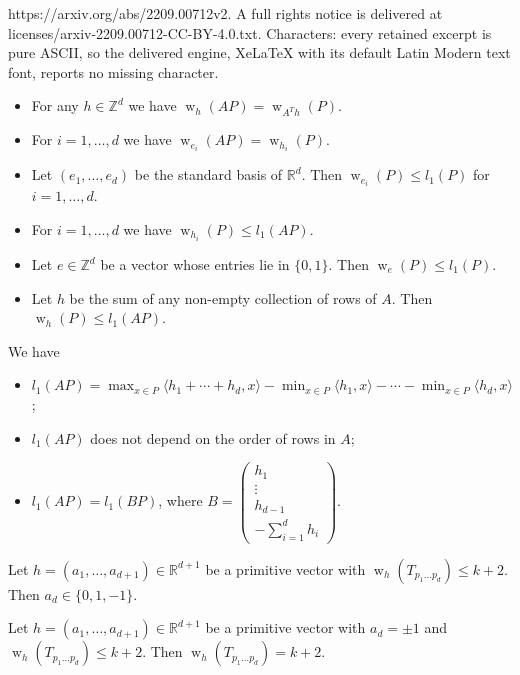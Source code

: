 \documentclass[10pt,a4paper]{amsart}
\newcommand{\R}{\mathbb R}
\newcommand{\Z}{\mathbb Z}
\newcommand{\w}{\operatorname{w}}
\begin{document}
https://arxiv.org/abs/2209.00712v2. A full rights notice is delivered at licenses/arxiv-2209.00712-CC-BY-4.0.txt. Characters: every retained excerpt is pure ASCII, so the delivered engine, XeLaTeX with its default Latin Modern text font, reports no missing character.
\begin{Lemma}\label{L:IntroLemma1}
\begin{itemize} 
\item[(1)] For any $h\in \Z^d$ we have $\w_{h}(AP)=\w_{A^{T}h}(P)$.
\item[(2)] For $i=1,\dots, d$ we have $\w_{e_i}(AP)=\w_{h_i}(P)$.
\item[(3)] Let $(e_1,\dots,e_d)$ be the standard basis of $\R^d$. Then $\w_{e_i}(P)\leq l_1(P)$ for $i=1,\dots, d$. 
\item[(4)] For $i=1,\dots, d$ we have $\w_{h_i}(P)\leq l_1(AP)$.
\item[(5)] Let $e\in\Z^d$ be a vector whose entries lie  in $\{0,1\}$. Then $\w_{e}(P)\leq l_1(P)$.
\item[(6)] Let $h$ be the sum of any non-empty collection of rows of $A$. Then $\w_{h}(P)\leq l_1(AP)$.
\end{itemize}
\end{Lemma}

\begin{Lemma}\label{L:IntroLemma2} We have
\begin{itemize} 
\item[(1)] 
$l_1(AP)=\max_{x\in P}\langle h_1+\cdots+h_d,x\rangle-\min_{x\in P}\langle h_1,x\rangle-\cdots-\min_{x\in P}\langle h_d,x\rangle$;
\item[(2)] $l_1(AP)$ does not depend on the order of rows in $A$;
\item[(3)] $
l_1(AP)=l_1(BP)$, where $B=\left(\begin{matrix}h_1\\ \vdots\\h_{d-1}\\
-\sum_{i=1}^d h_i
\end{matrix}\right).
$
\end{itemize}
\end{Lemma}

\begin{Lemma}\label{L:Lemma1} Let $h=(a_1,\dots, a_{d+1})\in\R^{d+1}$ be a primitive vector with $\w_{h}(T_{p_1\dots p_d})\leq k+2$.
Then $a_d\in\{0,1,-1\}$.
\end{Lemma}

\begin{Lemma}\label{L:Lemma2} Let $h=(a_1,\dots, a_{d+1})\in\R^{d+1}$ be a primitive vector with $a_d=\pm 1$ and  $\w_{h}(T_{p_1\dots p_d})\leq  k+2$.
Then $\w_{h}(T_{p_1\dots p_d})= k+2$.
\end{Lemma}
\end{document}
